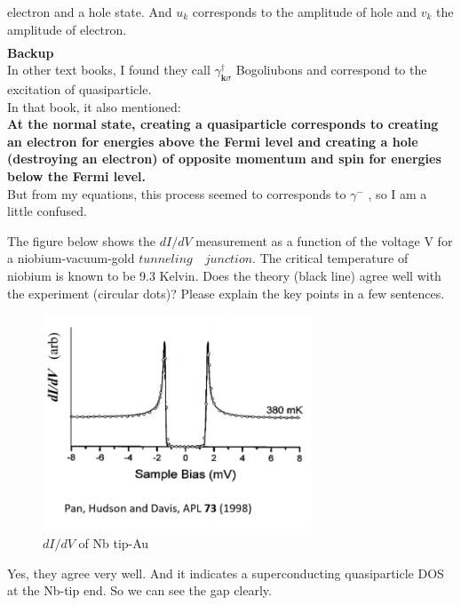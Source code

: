 \documentclass[answers]{exam}
\begin{document}
\begin{questions}
\begin{solution}
electron and a hole state. And $u_{k}$ corresponds to the amplitude of hole and $v_{k}$ the amplitude of electron.\\
\begin{align*}
\end{align*}
\textbf{Backup}\\
In other text books, I found they call $\gamma_{\mathbf{k} \sigma}^{\dagger}$ Bogoliubons and correspond to the excitation of quasiparticle.\\
In that book, it also mentioned:\\
\textbf{At the normal state, creating a quasiparticle corresponds to creating an electron for energies above
the Fermi level and creating a hole (destroying an electron) of opposite momentum and spin for energies
below the Fermi level.} \\
But from my equations, this process seemed to corresponds to $\gamma^{-}$ , so I am a little confused.
\end{solution}

\question The figure below shows the  $d I / d V$  measurement as a function of the voltage  V  for a niobium-vacuum-gold $tunneling \quad junction$. The critical temperature of niobium is known to be 9.3 Kelvin. Does the theory (black line) agree well with the experiment (circular dots)? Please explain the key points in a few
sentences.
\begin{figure}[h]
\centering
\includegraphics[width=8cm]{Figure/5.png}
\caption{$dI/dV$ of Nb tip-Au }
\end{figure}
\begin{solution}
Yes, they agree very well. And it indicates a superconducting quasiparticle DOS at the Nb-tip end. So we can see the gap clearly.
\end{solution}

\end{questions}
\end{document}
